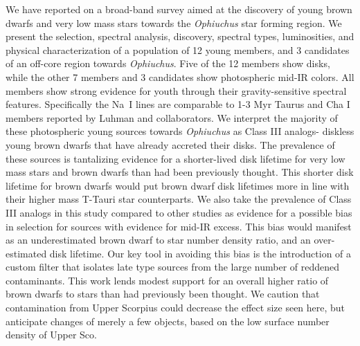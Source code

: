 We have reported on a broad-band survey aimed at the discovery of young brown dwarfs and very low mass stars towards the \emph{Ophiuchus} star forming region.  We present the selection, spectral analysis, discovery, spectral types, luminosities, and physical characterization of a population of 12 young members, and 3 candidates of an off-core region towards \emph{Ophiuchus}.  Five of the 12 members show disks, while the other 7 members and 3 candidates show photospheric mid-IR colors.  All members show strong evidence for youth through their gravity-sensitive spectral features.  Specifically the Na~I lines are comparable to 1-3 Myr Taurus and Cha I members reported by Luhman and collaborators.  We interpret the majority of these photospheric young sources towards \emph{Ophiuchus} as Class III analogs- diskless young brown dwarfs that have already accreted their disks.  The prevalence of these sources is tantalizing evidence for a shorter-lived disk lifetime for very low mass stars and brown dwarfs than had been previously thought.  This shorter disk lifetime for brown dwarfs would put brown dwarf disk lifetimes more in line with their higher mass T-Tauri star counterparts.  We also take the prevalence of Class III analogs in this study compared to other studies as evidence for a possible bias in selection for sources with evidence for mid-IR excess.  This bias would manifest as an underestimated brown dwarf to star number density ratio, and an over-estimated disk lifetime.  Our key tool in avoiding this bias is the introduction of a custom filter that isolates late type sources from the large number of reddened contaminants.  This work lends modest support for an overall higher ratio of brown dwarfs to stars than had previously been thought.  We caution that contamination from Upper Scorpius could decrease the effect size seen here, but anticipate changes of merely a few objects, based on the low surface number density of Upper Sco.
